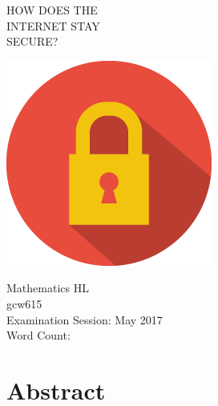 \documentclass[12pt, titlepage]{article}
\let\oldsection\section
\renewcommand\section{\clearpage\oldsection}
\begin{document}
\begin{titlepage}
    \vspace*{\fill}
	\centering

    {\titlefont HOW DOES THE}\\[0.5cm]
    {\titlefont INTERNET STAY}\\[0.5cm]
    {\titlefont SECURE?}

    \vspace{2.5cm}
    \includegraphics[scale=0.8]{title_image}
    \vspace{2.5cm}

    {\Large Mathematics HL} \\
    \vspace{0.5cm}
    {\Large gcw615}\\
    \vspace{0.5cm}
    {\Large Examination Session: May 2017} \\
    \vspace{0.5cm}
    {\Large Word Count: }
    \vspace*{\fill}
\end{titlepage}

\section*{Abstract}
\end{document}
